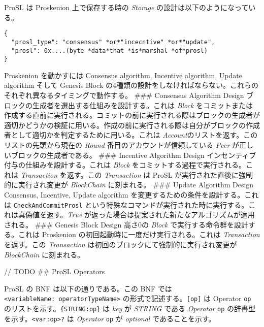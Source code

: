 ProSL は Proskenion 上で保存する時の \emph{Storage}
の設計は以下のようになっている。

\begin{verbatim}
{
  "prosl_type": "consensus" *or*"incecntive" *or*"update",
  "prosl": 0x....(byte *data*that *is*marshal *of*prosl)
}
\end{verbatim}

Proskenion を動かすには Consensus algorithm, Incentive algorithm, Update
algorithm そして Genesis Block
の4種類の設計をしなければならない。これらのそれぞれ異なるタイミングで動作する。
\#\#\# Consensus Algorithm Design
ブロックの生成者を選出する仕組みを設計する。これは \emph{Block}
をコミットまたは作成する直前に実行される。コミットの前に実行される際はブロックの生成者が適切かどうかの検証に用いる。作成の前に実行される際は自分がブロックの作成者として適切かを判定するために用いる。これは
\emph{Account}のリストを返す。このリストの先頭から現在の \emph{Round}
番目のアカウントが信頼している \emph{Peer}
が正しいブロックの生成者である。 \#\#\# Incentive Algorithm Design
インセンティブ付与の仕組みを設計する。これは \emph{Block}
をコミットする過程で実行される。これは \emph{Transaction} を返す。この
\emph{Transaction} は ProSL が実行された直後に強制的に実行され変更が
\emph{BlockChain} に刻まれる。 \#\#\# Update Algorithm Design Consensus,
Incentive, Update algorithm を変更するための条件を設計する。これは
\texttt{CheckAndCommitProsl}
という特殊なコマンドが実行された時に実行する。これは真偽値を返す。\emph{True}
が返った場合は提案された新たなアルゴリズムが適用される。 \#\#\# Genesis
Block Design 高さ0の \emph{Block} で実行する命令群を設計する。これは
Proskenion の初回起動時に一度だけ実行される。これは \emph{Transaction}
を返す。この \emph{Transaction}
は初回のブロックにて強制的に実行され変更が \emph{BlockChain}
に刻まれる。

// TODO \#\# ProSL Operators

ProSL の BNF は以下の通りである。この BNF では
\texttt{\textless{}variableName:\ operatorTypeName\textgreater{}}
の形式で記述する。\texttt{{[}op{]}} は Operator \texttt{op}
のリストを示す。\texttt{\{STRING:op\}} は \emph{key} が \emph{STRING}
である \emph{Operator} \texttt{op}
の辞書型を示す。\texttt{\textless{}var:op\textgreater{}?} は
\emph{Operator} \texttt{op} が \emph{optional} であることを示す。

